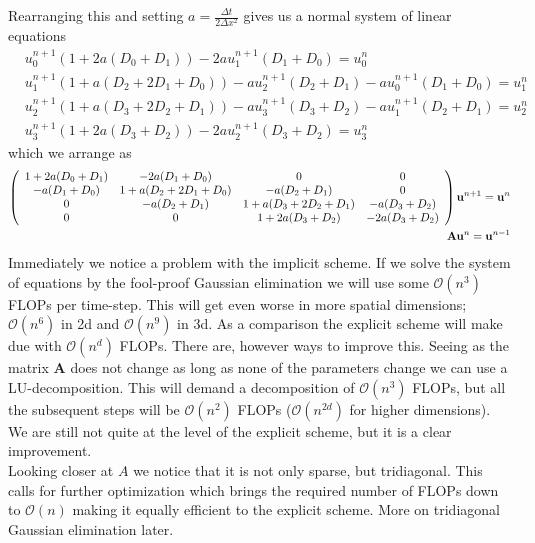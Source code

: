 Rearranging this and setting $a = \frac{\Delta t}{2\Delta x^2}$ gives us a normal system of linear equations
\begin{align*}
 &u^{n+1}_0\left(1+2a(D_0+D_1)\right)- 2au^{n+1}_{1}(D_1+D_0) =  u^n_0\\
 &u^{n+1}_1\left(1+a(D_2+2D_1+D_0)\right)-au^{n+1}_{2}(D_2+D_1)-au^{n+1}_{0}(D_1+D_0) = u^n_1\\
 &u^{n+1}_2\left(1+a(D_3+2D_2+D_1)\right)-au^{n+1}_{3}(D_3+D_2)-au^{n+1}_{1}(D_2+D_1) = u^n_2\\
 &u^{n+1}_3\left(1+2a(D_3+D_2)\right)- 2au^{n+1}_{2}(D_3+D_2) =  u^n_3
\end{align*}
which we arrange as 
{\tiny
\begin{align}\label{BE}
 \left(\begin{array}{c c c c}
        1+2a(D_0+D_1) & -2a(D_1+D_0) &0 &0 \\
        -a(D_1+D_0) &1+a(D_2+2D_1+D_0) & -a(D_2+D_1) &0 \\
        0& -a(D_2+D_1) & 1+a(D_3+2D_2+D_1)& -a(D_3+D_2)\\
        0& 0& 1+2a(D_3+D_2) & - 2a(D_3+D_2)\\
       \end{array}\right)\mathbf{u}^{n+1} = \mathbf{u}^{n} \\
 \mathbf{A}\mathbf{u}^n = \mathbf{u}^{n-1}
\end{align}
}
Immediately we notice a problem with the implicit scheme. If we solve the system of equations by the fool-proof Gaussian elimination we will use some $\mathcal O(n^3)$ FLOPs per time-step. This will get even worse in more spatial dimensions; $\mathcal O(n^6)$ in 2d and $\mathcal O(n^9)$ in 3d. 
As a comparison the explicit scheme will make due with $\mathcal O(n^d)$ FLOPs.
There are, however ways to improve this. Seeing as the matrix $\mathbf A$ does not change as long as none of the parameters change we can use a LU-decomposition. 
This will demand a decomposition of $\mathcal{O}(n^3)$ FLOPs, but all the subsequent steps will be $\mathcal{O}(n^2)$ FLOPs ($\mathcal O(n^{2d})$ for higher dimensions). 
We are still not quite at the level of the explicit scheme, but it is a clear improvement. \\
Looking closer at $A$ we notice that it is not only sparse, but tridiagonal. This calls for further optimization which brings the required number of FLOPs down to $\mathcal O(n)$ making it equally efficient to the explicit scheme. More on tridiagonal Gaussian elimination later.


